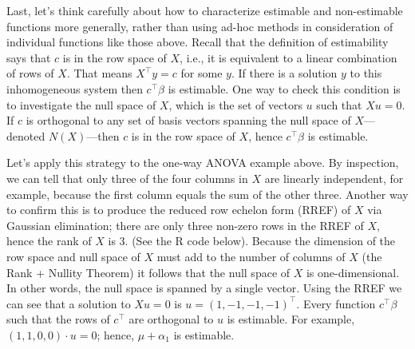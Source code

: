 \documentclass[
]{book}
\begin{document}
Last, let's think carefully about how to characterize estimable and non-estimable functions more generally, rather than using ad-hoc methods in consideration of individual functions like those above. Recall that the definition of estimability says that \(c\) is in the row space of \(X\), i.e., it is equivalent to a linear combination of rows of \(X\). That means \(X^\top y = c\) for some \(y\). If there is a solution \(y\) to this inhomogeneous system then \(c^\top \beta\) is estimable. One way to check this condition is to investigate the null space of \(X\), which is the set of vectors \(u\) such that \(Xu = 0\). If \(c\) is orthogonal to any set of basis vectors spanning the null space of \(X\)---denoted \(N(X)\)---then \(c\) is in the row space of \(X\), hence \(c^\top \beta\) is estimable.

Let's apply this strategy to the one-way ANOVA example above. By inspection, we can tell that only three of the four columns in \(X\) are linearly independent, for example, because the first column equals the sum of the other three. Another way to confirm this is to produce the reduced row echelon form (RREF) of \(X\) via Gaussian elimination; there are only three non-zero rows in the RREF of \(X\), hence the rank of \(X\) is 3. (See the R code below). Because the dimension of the row space and null space of \(X\) must add to the number of columns of \(X\) (the Rank + Nullity Theorem) it follows that the null space of \(X\) is one-dimensional. In other words, the null space is spanned by a single vector. Using the RREF we can see that a solution to \(Xu = 0\) is \(u = (1,-1,-1,-1)^\top\). Every function \(c^\top \beta\) such that the rows of \(c^\top\) are orthogonal to \(u\) is estimable. For example, \((1,1,0,0)\cdot u = 0\); hence, \(\mu+\alpha_1\) is estimable.
\end{document}
